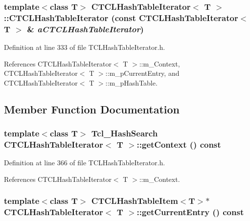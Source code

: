 \subsubsection{\setlength{\rightskip}{0pt plus 5cm}template$<$class T$>$ CTCLHash\-Table\-Iterator$<$ T $>$::CTCLHash\-Table\-Iterator (const CTCLHash\-Table\-Iterator$<$ T $>$ \& {\em a\-CTCLHash\-Table\-Iterator})\hspace{0.3cm}{\tt  [inline]}}\label{classCTCLHashTableIterator_a2}




Definition at line 333 of file TCLHash\-Table\-Iterator.h.

References CTCLHash\-Table\-Iterator$<$ T $>$::m\_\-Context, CTCLHash\-Table\-Iterator$<$ T $>$::m\_\-p\-Current\-Entry, and CTCLHash\-Table\-Iterator$<$ T $>$::m\_\-p\-Hash\-Table.

\subsection{Member Function Documentation}
\subsubsection{\setlength{\rightskip}{0pt plus 5cm}template$<$class T$>$ Tcl\_\-Hash\-Search CTCLHash\-Table\-Iterator$<$ T $>$::get\-Context () const\hspace{0.3cm}{\tt  [inline]}}\label{classCTCLHashTableIterator_a5}




Definition at line 366 of file TCLHash\-Table\-Iterator.h.

References CTCLHash\-Table\-Iterator$<$ T $>$::m\_\-Context.
\subsubsection{\setlength{\rightskip}{0pt plus 5cm}template$<$class T$>$ {\bf CTCLHash\-Table\-Item}$<$T$>$$\ast$ CTCLHash\-Table\-Iterator$<$ T $>$::get\-Current\-Entry () const\hspace{0.3cm}{\tt  [inline]}}\label{classCTCLHashTableIterator_a6}




